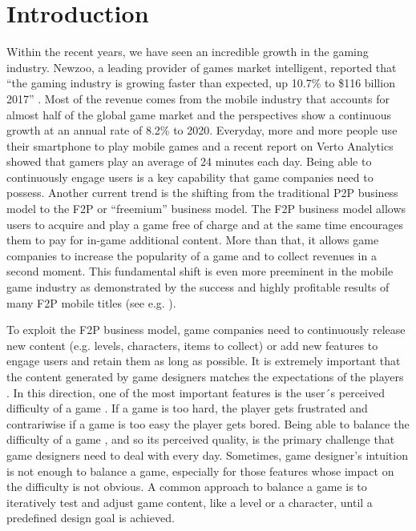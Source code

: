 \chapter{Introduction}
Within the recent years, we have seen an incredible growth in the gaming industry. Newzoo, a leading provider of games market intelligent, reported that “the gaming industry is growing faster than expected, up 10.7\% to \$116 billion 2017” \cite{takahashi_game_2017}. Most of the revenue comes from the mobile industry that accounts for almost half of the global game market and the perspectives show a continuous growth at an annual rate of 8.2\% to 2020. Everyday, more and more people use their smartphone to play mobile games and a recent report on Verto Analytics \cite{hwong_leveling_2016} showed that gamers play an average of 24 minutes each day. Being able to continuously engage users is a key capability that game companies need to possess. Another current trend is the shifting from the traditional \acf{P2P} business model to the \acf{F2P} or “freemium” business model. The \acs{F2P} business model allows users to acquire and play a game free of charge and at the same time encourages them to pay for in-game additional content. More than that, it allows game companies to increase the popularity of a game and to collect revenues in a second moment. This fundamental shift is even more preeminent in the mobile game industry as demonstrated by the success and highly profitable results of many \acs{F2P} mobile titles (see e.g. \cite{alha_critical_2016,alha_free--play_2014,fields_mobile_2014,civelek_pricing_2018,hamari_service_2017,hamari_why_2017}). 

To exploit the \acs{F2P} business model, game companies need to continuously release new content (e.g. levels, characters, items to collect) or add new features to engage users and retain them as long as possible. It is extremely important that the content generated by game designers matches the expectations of the players \cite{hamari_service_2017}. In this direction, one of the most important features is the user´s perceived difficulty of a game \cite{alexander_investigation_2013}. If a game is too hard, the player gets frustrated and contrariwise if a game is too easy the player gets bored. Being able to balance the difficulty of a game \cite{hunicke_case_2005}, and so its perceived quality, is the primary challenge that game designers need to deal with every day. Sometimes, game designer’s intuition is not enough to balance a game, especially for those features whose impact on the difficulty is not obvious. A common approach to balance a game is to iteratively test and adjust game content, like a level or a character, until a predefined design goal is achieved.

